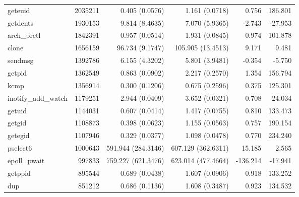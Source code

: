 \begin{longtable}{>{\ttfamily}lrrrrr}
                        geteuid &    2035211 &              0.405 (0.0576) &            1.161 (0.0718) &           0.756 &      186.801 \\
                       getdents &    1930153 &              9.814 (8.4635) &            7.070 (5.9365) &          -2.743 &      -27.953 \\
                    arch\_prctl &    1842391 &              0.957 (0.0514) &            1.931 (0.0845) &           0.974 &      101.878 \\
                          clone &    1656159 &             96.734 (9.1747) &         105.905 (13.4513) &           9.171 &        9.481 \\
                        sendmsg &    1392786 &              6.155 (4.3202) &            5.801 (3.9481) &          -0.354 &       -5.750 \\
                         getpid &    1362549 &              0.863 (0.0902) &            2.217 (0.2570) &           1.354 &      156.794 \\
                           kcmp &    1356914 &              0.300 (0.1206) &            0.675 (0.2596) &           0.375 &      125.301 \\
            inotify\_add\_watch &    1179251 &              2.944 (0.0409) &            3.652 (0.0321) &           0.708 &       24.034 \\
                         getuid &    1144031 &              0.607 (0.0414) &            1.417 (0.0755) &           0.810 &      133.473 \\
                         getgid &    1108873 &              0.398 (0.0623) &            1.155 (0.0563) &           0.757 &      190.154 \\
                        getegid &    1107946 &              0.329 (0.0377) &            1.098 (0.0478) &           0.770 &      234.240 \\
                       pselect6 &    1000643 &          591.944 (284.3146) &        607.129 (362.6311) &          15.185 &        2.565 \\
                   epoll\_pwait &     997833 &          759.227 (621.3476) &        623.014 (477.4664) &        -136.214 &      -17.941 \\
                        getppid &     895544 &              0.689 (0.0438) &            1.607 (0.0906) &           0.918 &      133.252 \\
                            dup &     851212 &              0.686 (0.1136) &            1.608 (0.3487) &           0.923 &      134.532 \\

\end{longtable}
